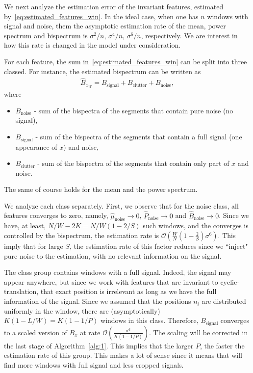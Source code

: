 \documentclass[journal]{IEEEtran}
\numberwithin{equation}{section}
\numberwithin{figure}{section}
\theoremstyle{plain}
\theoremstyle{definition}
\theoremstyle{remark}
\theoremstyle{plain}
\theoremstyle{remark}
\theoremstyle{plain}
\theoremstyle{plain}
\newcommand{\order}[1]{\mathcal{O}\left({#1} \right)}
\begin{document}
We next analyze the estimation error of the invariant features, estimated by~\eqref{eq:estimated_features_win}.  
In the ideal case, when one has $n$ windows with signal and noise, them  the asymptotic  estimation rate of the mean, power spectrum and bispectrum is $\sigma^2/n,\,\sigma^4/n,\,\sigma^6/n$, respectively. We are interest in how this rate is changed in the model under consideration.

For each feature, the sum in~\eqref{eq:estimated_features_win} can be split into three classed. For instance, the estimated bispectrum can be written as
\begin{eqnarray}
\hat{B}_{x_W} = B_\textrm{signal} + B_\textrm{clutter} + B_\textrm{noise}, 
\end{eqnarray}
where
\begin{itemize}
	\item $B_\textrm{noise}$ - sum of the bispectra of the segments that contain pure noise (no signal),
	\item $B_\textrm{signal}$ - sum of the bispectra of the segments that contain a full signal (one appearance of $x$) and noise,
	\item $B_\textrm{clutter}$ - sum of the bispectra of the segments that contain only part of $x$ and noise.
\end{itemize}
The same of course holds for the mean and the power spectrum. 


We analyze each class separately. First, we observe that for the noise class, all features converges to zero, namely, $\hat{\mu}_\textrm{noise}\to 0$, $\hat{P}_\textrm{noise}\to 0$ and $\hat{B}_\textrm{noise}\to 0$. Since  we have, at least, $N/W-2K =N/W(1-2/S) $ such windows, and the converges is controlled by the bispectrum, the estimation rate is  $\order{\frac{W}{N}\left(1-\frac{2}{S}\right)\sigma^6}$. This imply that for large $S$, the estimation rate of this factor reduces since we ``inject" pure noise to the estimation, with no relevant information on the signal.

The class group contains windows with a full signal. Indeed, the signal may appear anywhere, but since we work with features that are invariant to cyclic-translation, that exact position is irrelevant as long as we have the full information of the signal. Since we assumed that the positions  $n_i$ are distributed uniformly in the window, there are (asymptotically) $K(1-L/W) = K(1-1/P)$ windows in this class. 
Therefore, $B_\textrm{signal}$ converges to a scaled version of $B_x$  at rate $\order{\frac{\sigma^6}{K(1-1/P)}}$. The scaling will be corrected in the last stage of Algorithm~\ref{alg:1}. This implies that the larger $P$, the faster the estimation rate of this group. This makes a lot of sense since it means that will find more windows with full signal and less cropped signals.
\end{document}
